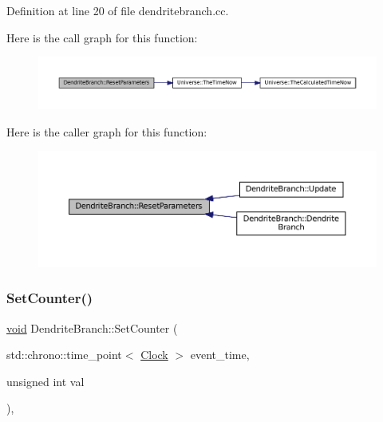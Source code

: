 Definition at line 20 of file dendritebranch.\+cc.

Here is the call graph for this function\+:\nopagebreak
\begin{figure}[H]
\begin{center}
\leavevmode
\includegraphics[width=350pt]{class_dendrite_branch_a70b5e63fc44166ccd7f0c7177660c250_cgraph}
\end{center}
\end{figure}
Here is the caller graph for this function\+:\nopagebreak
\begin{figure}[H]
\begin{center}
\leavevmode
\includegraphics[width=350pt]{class_dendrite_branch_a70b5e63fc44166ccd7f0c7177660c250_icgraph}
\end{center}
\end{figure}
\mbox{\label{class_dendrite_branch_a2ce03fbad4a70564eeaafb62debd4d74}} 
\subsubsection{\texorpdfstring{Set\+Counter()}{SetCounter()}}
{\footnotesize\ttfamily \mbox{\hyperlink{glad_8h_a950fc91edb4504f62f1c577bf4727c29}{void}} Dendrite\+Branch\+::\+Set\+Counter (\begin{DoxyParamCaption}\item[{std\+::chrono\+::time\+\_\+point$<$ \mbox{\hyperlink{universe_8h_a0ef8d951d1ca5ab3cfaf7ab4c7a6fd80}{Clock}} $>$}]{event\+\_\+time,  }\item[{unsigned int}]{val }\end{DoxyParamCaption})\hspace{0.3cm}{\ttfamily [inline]}, {\ttfamily [virtual]}}




